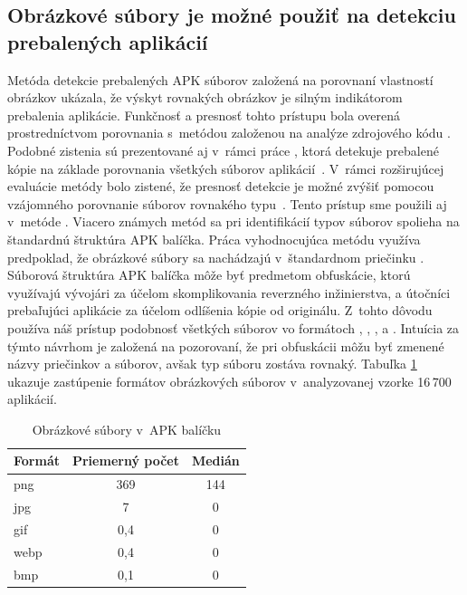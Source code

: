 \subsection*{Obrázkové súbory je možné použiť na detekciu prebalených aplikácií}
Metóda detekcie prebalených APK súborov  založená na porovnaní vlastností obrázkov ukázala, že výskyt rovnakých obrázkov je silným indikátorom prebalenia aplikácie. Funkčnosť a presnosť tohto prístupu bola overená prostredníctvom porovnania s~metódou založenou na analýze zdrojového kódu \cite{ImageStruct}. Podobné zistenia sú prezentované aj v~rámci práce , ktorá detekuje prebalené kópie na základe porovnania všetkých súborov aplikácií~\cite{Zhauniarovich2014}. V~rámci rozširujúcej evaluácie metódy  bolo zistené, že presnosť detekcie je možné zvýšiť pomocou vzájomného porovnanie súborov rovnakého typu~\cite{Gadyatskaya2016}. Tento prístup sme použili aj v~metóde . Viacero známych metód sa pri identifikácií typov súborov spolieha na štandardnú štruktúra APK balíčka. Práca vyhodnocujúca metódu  využíva predpoklad, že obrázkové súbory sa nachádzajú v~štandardnom priečinku . Súborová štruktúra APK balíčka môže byť predmetom obfuskácie, ktorú využívajú vývojári za účelom skomplikovania reverzného inžinierstva, a útočníci prebaľujúci aplikácie za účelom odlíšenia kópie od originálu. Z~tohto dôvodu používa náš prístup podobnosť všetkých súborov vo formátoch , , ,  a . Intuícia za týmto návrhom je založená na pozorovaní, že pri obfuskácii môžu byť zmenené názvy priečinkov a súborov, avšak typ súboru zostáva rovnaký. Tabuľka \ref{images-apk} ukazuje zastúpenie formátov obrázkových súborov v~analyzovanej vzorke 16\,700 aplikácií.
\begin{table}[]
\centering
\label{images-apk}
\begin{tabular}{|l|c|c|}
\hline
\textbf{Formát} & \textbf{Priemerný počet}  & \textbf{Medián}         \\ \hline
png             & 369                       & 144         \\
jpg             & 7                         & 0                 \\
gif             & 0,4                       & 0             \\
webp            & 0,4                       & 0         \\
bmp             & 0,1                       & 0         \\
\hline
\end{tabular}
\caption{Obrázkové súbory v~APK balíčku}
\end{table}

